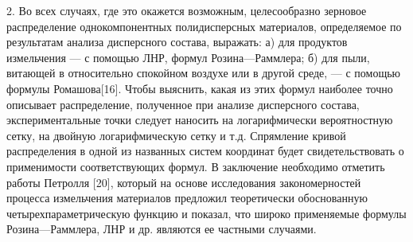 2. Во всех случаях, где это окажется возможным, целесообразно зерновое распределение однокомпонентных полидисперсных материалов, определяемое по результатам анализа дисперсного состава, выражать: 
а) для продуктов измельчения — с помощью ЛНР, формул Розина—Раммлера; 
б) для пыли, витающей в относительно спокойном воздухе или в другой среде, — с помощью формулы Ромашова[16]. 
Чтобы выяснить, какая из этих формул наиболее точно описывает распределение, полученное при анализе дисперсного состава, экспериментальные точки следует наносить на логарифмически вероятностную сетку, на двойную логарифмическую сетку и т.д. Спрямление кривой распределения в одной из названных систем координат будет свидетельствовать о применимости соответствующих формул. 
В заключение необходимо отметить работы Петролля [20], который на основе исследования закономерностей процесса измельчения материалов предложил теоретически обоснованную четырехпараметрическую функцию и показал, что широко применяемые формулы Розина—Раммлера, ЛНР и др. являются ее частными случаями.


\clearpage